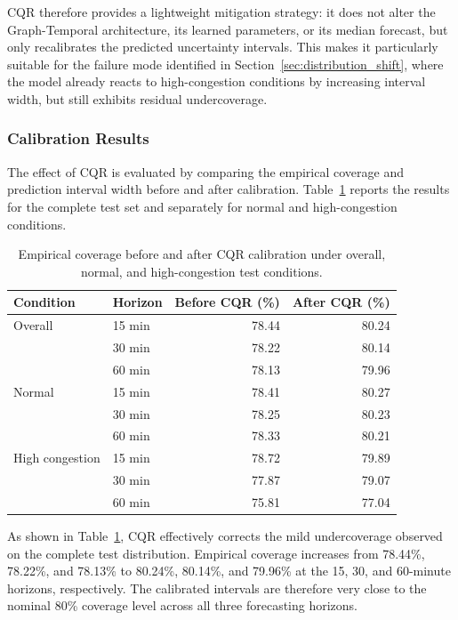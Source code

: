 CQR therefore provides a lightweight mitigation strategy: it does not alter
the Graph-Temporal architecture, its learned parameters, or its median
forecast, but only recalibrates the predicted uncertainty intervals. This
makes it particularly suitable for the failure mode identified in
Section~\ref{sec:distribution_shift}, where the model already reacts to
high-congestion conditions by increasing interval width, but still exhibits
residual undercoverage.


\subsubsection{Calibration Results}
\label{subsubsec:cqr_results}

The effect of CQR is evaluated by comparing the empirical coverage and
prediction interval width before and after calibration. Table~\ref{tab:cqr_results}
reports the results for the complete test set and separately for normal and
high-congestion conditions.

\begin{table}[t]
    \centering
    \caption{Empirical coverage before and after CQR calibration under
    overall, normal, and high-congestion test conditions.}
    \label{tab:cqr_results}
    \begin{tabular}{llrr}
        \toprule
        Condition & Horizon & Before CQR (\%) & After CQR (\%) \\
        \midrule
        Overall
        & 15 min & 78.44 & 80.24 \\
        & 30 min & 78.22 & 80.14 \\
        & 60 min & 78.13 & 79.96 \\
        \midrule
        Normal
        & 15 min & 78.41 & 80.27 \\
        & 30 min & 78.25 & 80.23 \\
        & 60 min & 78.33 & 80.21 \\
        \midrule
        High congestion
        & 15 min & 78.72 & 79.89 \\
        & 30 min & 77.87 & 79.07 \\
        & 60 min & 75.81 & 77.04 \\
        \bottomrule
    \end{tabular}
\end{table}

As shown in Table~\ref{tab:cqr_results}, CQR effectively corrects the mild
undercoverage observed on the complete test distribution. Empirical coverage
increases from 78.44\%, 78.22\%, and 78.13\% to 80.24\%, 80.14\%, and
79.96\% at the 15, 30, and 60-minute horizons, respectively. The calibrated
intervals are therefore very close to the nominal 80\% coverage level across
all three forecasting horizons.

